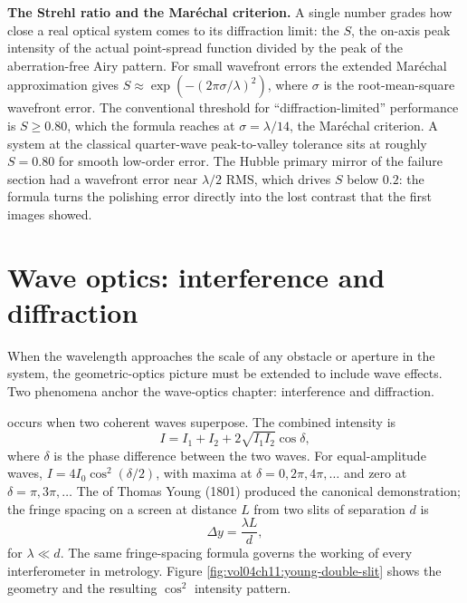 \begin{mastery}
\textbf{The Strehl ratio and the Mar\'echal criterion.} A single number
grades how close a real optical system comes to its diffraction limit:
the  $S$, the on-axis peak intensity of the
actual point-spread function divided by the peak of the aberration-free
Airy pattern. For small wavefront errors the extended Mar\'echal
approximation gives $S \approx \exp(-(2\pi\sigma/\lambda)^{2})$, where
$\sigma$ is the root-mean-square wavefront error. The conventional
threshold for ``diffraction-limited'' performance is $S \ge 0.80$, which
the formula reaches at $\sigma = \lambda/14$, the Mar\'echal criterion.
A system at the classical quarter-wave peak-to-valley tolerance sits at
roughly $S = 0.80$ for smooth low-order error. The Hubble primary mirror
of the failure section had a wavefront error near $\lambda/2$ RMS, which
drives $S$ below $0.2$: the formula turns the polishing error directly
into the lost contrast that the first images showed.
\end{mastery}

\section{Wave optics: interference and diffraction}

When the wavelength approaches the scale of any obstacle or aperture
in the system, the geometric-optics picture must be extended to
include wave effects. Two phenomena anchor the wave-optics chapter:
interference and diffraction.

 occurs when two coherent waves superpose. The
combined intensity is
\[
I = I_{1} + I_{2} + 2\sqrt{I_{1}I_{2}}\cos\delta,
\]
where $\delta$ is the phase difference between the two waves. For
equal-amplitude waves, $I = 4I_{0}\cos^{2}(\delta/2)$, with maxima at
$\delta = 0, 2\pi, 4\pi, \ldots$ and zero at $\delta = \pi, 3\pi,
\ldots$ The  of Thomas Young (1801)
produced the canonical demonstration; the fringe spacing on a screen
at distance $L$ from two slits of separation $d$ is
\[
\Delta y = \frac{\lambda L}{d},
\]
for $\lambda \ll d$. The same fringe-spacing formula governs the
working of every interferometer in metrology. Figure
\ref{fig:vol04ch11:young-double-slit} shows the geometry and the
resulting $\cos^{2}$ intensity pattern.



